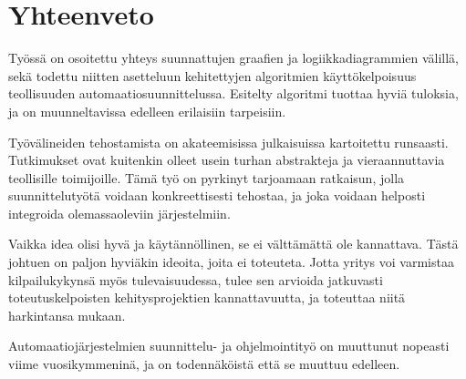\documentclass[finnish,12pt]{article}
\begin{document}
	\clearpage

	\section{Yhteenveto}

Työssä on osoitettu yhteys suunnattujen graafien ja logiikkadiagrammien välillä, sekä todettu niitten asetteluun kehitettyjen algoritmien käyttökelpoisuus teollisuuden automaatiosuunnittelussa.
Esitelty algoritmi tuottaa hyviä tuloksia, ja on muunneltavissa edelleen erilaisiin tarpeisiin.

Työvälineiden tehostamista on akateemisissa julkaisuissa kartoitettu runsaasti.
Tutkimukset ovat kuitenkin olleet usein turhan abstrakteja ja vieraannuttavia teollisille toimijoille.
Tämä työ on pyrkinyt tarjoamaan ratkaisun, jolla suunnittelutyötä voidaan konkreettisesti tehostaa, ja joka voidaan helposti integroida olemassaoleviin järjestelmiin.

Vaikka idea olisi hyvä ja käytännöllinen, se ei välttämättä ole kannattava.
Tästä johtuen on paljon hyviäkin ideoita, joita ei toteuteta.
Jotta yritys voi varmistaa kilpailukykynsä myös tulevaisuudessa, tulee sen arvioida jatkuvasti toteutuskelpoisten kehitysprojektien kannattavuutta, ja toteuttaa niitä harkintansa mukaan.

Automaatiojärjestelmien suunnittelu- ja ohjelmointityö on muuttunut nopeasti viime vuosikymmeninä, ja on todennäköistä että se muuttuu edelleen.


\clearpage
{}


\end{document}
